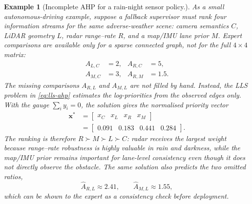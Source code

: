 \documentclass{ieeeaccess}
\newtheorem{example}{Example}
\begin{document}
\smallskip
\begin{example}[Incomplete AHP for a rain-night sensor policy.]
As a small autonomous-driving example, suppose a fallback supervisor must rank four information streams for the same adverse-weather scene: camera semantics \(C\), LiDAR geometry \(L\), radar range--rate \(R\), and a map/IMU lane prior \(M\). Expert comparisons are available only for a sparse connected graph, not for the full \(4\times4\) matrix:
\[
\begin{aligned}
A_{L,C}&=2, & A_{R,C}&=5,\\
A_{M,C}&=3, & A_{R,M}&=1.5 .
\end{aligned}
\]
The missing comparisons \(A_{R,L}\) and \(A_{M,L}\) are not filled by hand. Instead, the LLS problem in \eqref{eq:lls-ahp} estimates the log-priorities from the observed edges only. With the gauge \(\sum_i y_i=0\), the solution gives the normalised priority vector
\begin{equation}
\begin{aligned}
\bm{x}^{*}
&=\begin{bmatrix}x_C & x_L & x_R & x_M\end{bmatrix}\\
&=\begin{bmatrix}0.091 & 0.183 & 0.441 & 0.284\end{bmatrix}.
\end{aligned}
\label{eq:incomplete-ahp-example-weights}
\end{equation}
The ranking is therefore \(R \succ M \succ L \succ C\): radar receives the largest weight because range--rate robustness is highly valuable in rain and darkness, while the map/IMU prior remains important for lane-level consistency even though it does not directly observe the obstacle. The same solution also predicts the two omitted ratios,
\begin{equation}
\widehat{A}_{R,L}\approx2.41,\qquad
\widehat{A}_{M,L}\approx1.55,
\end{equation}
which can be shown to the expert as a consistency check before deployment.

\begin{figure}[t]
    \centering
\end{figure}
\end{example}
\end{document}
